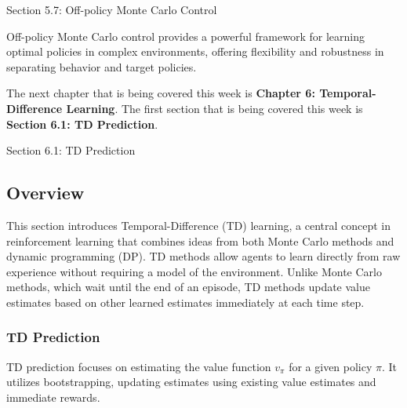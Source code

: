 \begin{notes}{Section 5.7: Off-policy Monte Carlo Control}
\begin{highlight}
        Off-policy Monte Carlo control provides a powerful framework for learning optimal policies in complex environments, offering flexibility and robustness in separating behavior and target policies.
    
    \end{highlight}
\end{notes}

The next chapter that is being covered this week is \textbf{Chapter 6: Temporal-Difference Learning}. The first section that is being covered this week is \textbf{Section 6.1: TD Prediction}.

\begin{notes}{Section 6.1: TD Prediction}
    \subsection*{Overview}

    This section introduces Temporal-Difference (TD) learning, a central concept in reinforcement learning that combines ideas from both Monte Carlo methods and dynamic programming (DP). TD methods allow 
    agents to learn directly from raw experience without requiring a model of the environment. Unlike Monte Carlo methods, which wait until the end of an episode, TD methods update value estimates based on 
    other learned estimates immediately at each time step.
    
    \subsubsection*{TD Prediction}
    
    TD prediction focuses on estimating the value function $v_\pi$ for a given policy $\pi$. It utilizes bootstrapping, updating estimates using existing value estimates and immediate rewards.
    
    \begin{highlight}[TD Prediction]
    

\end{highlight}
\end{notes}
